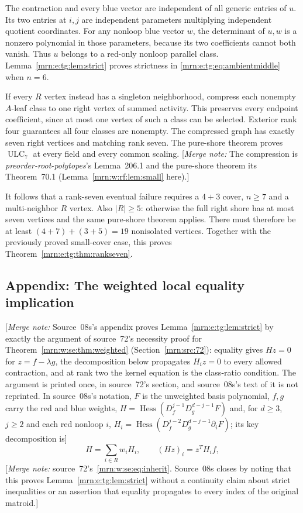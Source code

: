 \documentclass[11pt,a4paper]{article}
\theoremstyle{remark}\newtheorem{remark}[theorem]{Remark}
\newcommand{\ULC}{\operatorname{ULC}}      %
\newcommand{\mnote}[1]{[\textit{Merge note:} #1]}
\newcommand{\prp}{\emph{preorder-root-polytopes}}
\begin{document}
The contraction and every blue vector are independent of all generic entries of $u$. Its two entries at $i,j$ are independent parameters multiplying independent quotient coordinates. For any nonloop blue vector $w$, the determinant of $u,w$ is a nonzero polynomial in those parameters, because its two coefficients cannot both vanish. Thus $u$ belongs to a red-only nonloop parallel class. Lemma~\ref{mrn:e:tg:lem:strict} proves strictness in \eqref{mrn:e:tg:eq:ambientmiddle} when $n=6$.

If every $R$ vertex instead has a singleton neighborhood, compress each nonempty $A$-leaf class to one right vertex of summed activity. This preserves every endpoint coefficient, since at most one vertex of such a class can be selected. Exterior rank four guarantees all four classes are nonempty. The compressed graph has exactly seven right vertices and matching rank seven. The pure-shore theorem proves $\ULC_7$ at every field and every common scaling. \mnote{The compression is \prp's Lemma~206.1 and the pure-shore theorem its Theorem~70.1 (Lemma~\ref{mrn:w:rf:lem:small} here).}

It follows that a rank-seven eventual failure requires a $4+3$ cover, $n\ge7$ and a multi-neighbor $R$ vertex. Also $|R|\ge5$: otherwise the full right shore has at most seven vertices and the same pure-shore theorem applies. There must therefore be at least $(4+7)+(3+5)=19$ nonisolated vertices. Together with the previously proved small-cover case, this proves Theorem~\ref{mrn:e:tg:thm:rankseven}.


\subsection{Appendix: The weighted local equality implication}
\mnote{Source~08s's appendix proves Lemma~\ref{mrn:e:tg:lem:strict} by exactly the argument of source~72's necessity proof for Theorem~\ref{mrn:w:se:thm:weighted} (Section~\ref{mrn:src:72}): equality gives $Hz=0$ for $z=f-\lambda g$, the decomposition below propagates $H_iz=0$ to every allowed contraction, and at rank two the kernel equation is the class-ratio condition. The argument is printed once, in source~72's section, and source~08s's text of it is not reprinted. In source~08s's notation, $F$ is the unweighted basis polynomial, $f,g$ carry the red and blue weights, $H=\operatorname{Hess}(D_f^{j-1}D_g^{d-j-1}F)$ and, for $d\ge3$, $j\ge2$ and each red nonloop $i$, $H_i=\operatorname{Hess}(D_f^{j-2}D_g^{d-j-1}\partial_iF)$; its key decomposition is}
\begin{equation}\label{mrn:e:tg:eq:kernel}
 H=\sum_{i\in R}w_iH_i,\qquad (Hz)_i=z^TH_if,
\end{equation}
\mnote{source~72's~\eqref{mrn:w:se:eq:inherit}. Source~08s closes by noting that this proves Lemma~\ref{mrn:e:tg:lem:strict} without a continuity claim about strict inequalities or an assertion that equality propagates to every index of the original matroid.}
\end{document}
